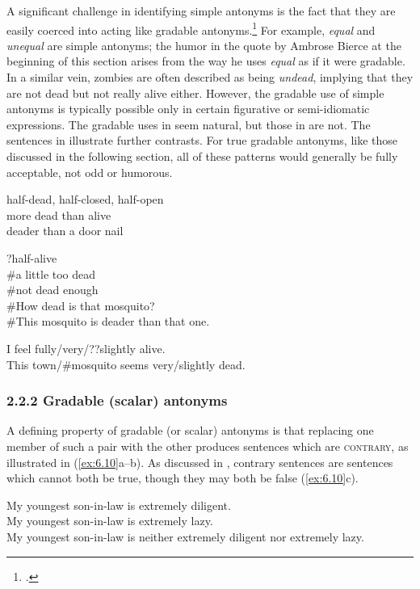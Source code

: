 A significant challenge in identifying simple antonyms is the fact that they are easily coerced into acting like gradable antonyms.\footnote{\citet[463]{Cann2011}.} For example, \textit{equal} and \textit{unequal} are simple antonyms; the humor in the quote by Ambrose Bierce at the beginning of this section arises from the way he uses \textit{equal} as if it were gradable. In a similar vein, zombies are often described as being \textit{undead}, implying that they are not dead but not really alive either. However, the gradable use of simple antonyms is typically possible only in certain figurative or semi-idiomatic expressions. The gradable uses in  seem natural, but those in  are not. The sentences in  illustrate further contrasts. For true gradable antonyms, like those discussed in the following section, all of these patterns would generally be fully acceptable, not odd or humorous.


\ea \label{ex:6.7}
\ea half-dead, half-closed, half-open\\
\ex more dead than alive\\
\ex deader than a door nail
                       \z
\z

\ea \label{ex:6.8}
\ea ?half-alive\\
\ex \#a little too dead\\
\ex \#not dead enough\\
\ex \#How dead is that mosquito?\\
\ex \#This mosquito is deader than that one.
                       \z
\z

\ea \label{ex:6.9}
\ea I feel fully/very/??slightly alive.\\
\ex This town/\#mosquito seems very/slightly dead.
                       \z
\z

\subsubsection{2.2.2 Gradable (scalar) antonyms}\label{sec:}

A defining property of gradable (or scalar) antonyms is that replacing one member of such a pair with the other produces sentences which are \textsc{contrary}, as illustrated in (\ref{ex:6.10}a--b). As discussed in , contrary sentences are sentences which cannot both be true, though they may both be false (\ref{ex:6.10}c).


\ea \label{ex:6.10}
\ea My youngest son-in-law is extremely diligent.\\
\ex My youngest son-in-law is extremely lazy.\\
\ex My youngest son-in-law is neither extremely diligent nor extremely lazy.
                       \z
\z


